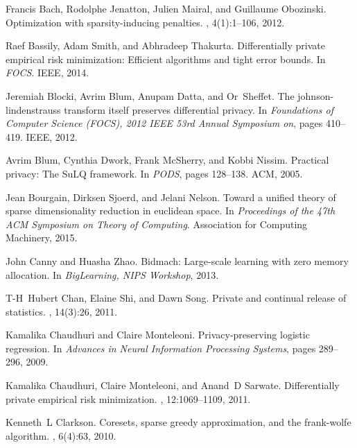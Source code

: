 \documentclass{article}
\theoremstyle{plain}
\begin{document}
\begin{thebibliography}{10}

Francis Bach, Rodolphe Jenatton, Julien Mairal, and Guillaume Obozinski.
\newblock Optimization with sparsity-inducing penalties.
, 4(1):1--106, 2012.

Raef Bassily, Adam Smith, and Abhradeep Thakurta.
\newblock Differentially private empirical risk minimization: Efficient
  algorithms and tight error bounds.
\newblock In {\em FOCS}. IEEE, 2014.

Jeremiah Blocki, Avrim Blum, Anupam Datta, and Or~Sheffet.
\newblock The johnson-lindenstrauss transform itself preserves differential
  privacy.
\newblock In {\em Foundations of Computer Science (FOCS), 2012 IEEE 53rd Annual
  Symposium on}, pages 410--419. IEEE, 2012.

Avrim Blum, Cynthia Dwork, Frank McSherry, and Kobbi Nissim.
\newblock Practical privacy: The {SuLQ} framework.
\newblock In {\em PODS}, pages 128--138. ACM, 2005.

Jean Bourgain, Dirksen Sjoerd, and Jelani Nelson.
\newblock Toward a unified theory of sparse dimensionality reduction in
  euclidean space.
\newblock In {\em Proceedings of the 47th ACM Symposium on Theory of
  Computing}. Association for Computing Machinery, 2015.

John Canny and Huasha Zhao.
\newblock Bidmach: Large-scale learning with zero memory allocation.
\newblock In {\em BigLearning, NIPS Workshop}, 2013.

T-H~Hubert Chan, Elaine Shi, and Dawn Song.
\newblock Private and continual release of statistics.
,
  14(3):26, 2011.

Kamalika Chaudhuri and Claire Monteleoni.
\newblock Privacy-preserving logistic regression.
\newblock In {\em Advances in Neural Information Processing Systems}, pages
  289--296, 2009.

Kamalika Chaudhuri, Claire Monteleoni, and Anand~D Sarwate.
\newblock Differentially private empirical risk minimization.
, 12:1069--1109, 2011.

Kenneth~L Clarkson.
\newblock Coresets, sparse greedy approximation, and the frank-wolfe algorithm.
, 6(4):63, 2010.


\end{thebibliography}
\end{document}
